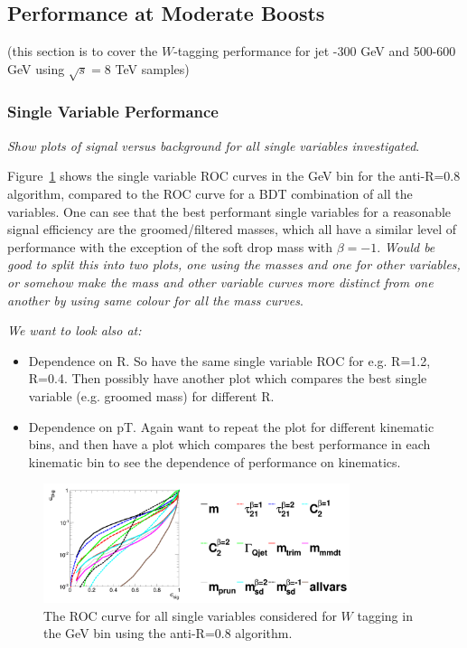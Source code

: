 \subsection{Performance at Moderate Boosts}

(this section is to cover the $W$-tagging performance for jet -300 GeV and
500-600 GeV using $\sqrt{s} = 8$ TeV samples)

\subsubsection{Single Variable Performance}

{\it Show plots of signal versus background for all single variables investigated}.

Figure~\ref{fig:pt500_single_AKt_R08} shows the single variable ROC curves in
the  GeV bin for the anti-\kT R=0.8 algorithm, compared to the
ROC curve for a BDT combination of all the variables. One can see that
the best performant single variables for a reasonable signal
efficiency are the groomed/filtered masses, which all have a similar
level of performance with the exception of the soft drop mass with $\beta=-1$. {\it Would be good to split this into two plots, one
using the masses and one for other variables, or somehow make the mass
and other variable curves more distinct from one another by using same
colour for all the mass curves}.

{\it We want to look also at:
\begin{itemize}
\item Dependence on R. So have the same single variable ROC for
e.g. R=1.2, R=0.4. Then possibly have another plot which compares the
best single variable (e.g. groomed mass) for
different R.
\item Dependence on pT. Again want to repeat the plot for different
kinematic bins, and then have a plot which compares the best
performance in each kinematic bin to see the dependence of performance
on kinematics.
\end{itemize}
}

\begin{figure}
\begin{center}
\includegraphics[width=0.8\textwidth]{./Figures/WTagging/pT500/AKtR08/Rocs_1D_single.png}
\caption{The ROC curve for all single variables considered for $W$
tagging in the  GeV bin using the anti-\kT R=0.8 algorithm.}
\label{fig:pt500_single_AKt_R08}
\end{center}
\end{figure}

